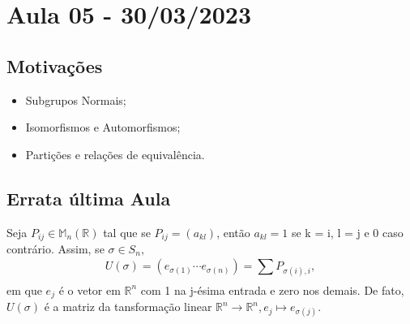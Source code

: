 \documentclass[algebra_notes.tex]{subfiles}
\begin{document}
\section{Aula 05 - 30/03/2023}
\subsection{Motivações}
\begin{itemize}
	\item Subgrupos Normais;
	\item Isomorfismos e Automorfismos;
	\item Partições e relações de equivalência.
\end{itemize}
\subsection*{Errata última Aula}
Seja $P_{ij}\in \mathbb{M}_{n}(\mathbb{R})$ tal que se $P_{ij}=(a_{kl})$, então $a_{kl} = 1$ se k = i, l = j e 0 caso contrário.
Assim, se $\sigma\in S_{n},$
$$
	U(\sigma) = (e_{\sigma(1)}\cdots e_{\sigma(n)}) = \sum\limits_{}^{}P_{\sigma(i), i},
$$
em que $e_{j}$ é o vetor em $\mathbb{R}^{n}$ com 1 na j-ésima entrada e zero nos demais. De fato, $U(\sigma)$ é a matriz
da tansformação linear $\mathbb{R}^{n}\rightarrow \mathbb{R}^{n}, e_{j}\mapsto e_{\sigma(j)}.$
\end{document}
